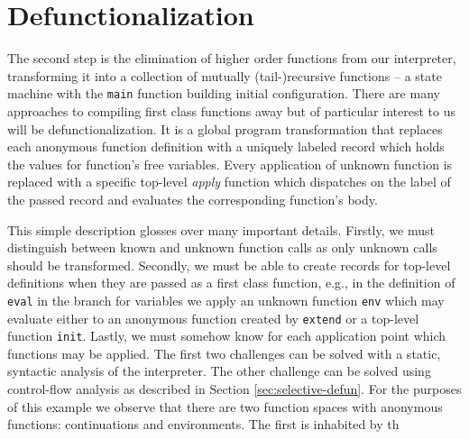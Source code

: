 \section{Defunctionalization}
The second step is the elimination of higher order functions from our interpreter, transforming it into a collection of mutually (tail-)recursive functions -- a state machine with the \texttt{main} function building initial configuration.
There are many approaches to compiling first class functions away but of particular interest to us will be defunctionalization.
It is a global program transformation that replaces each anonymous function definition with a uniquely labeled record which holds the values for function's free variables.
Every application of unknown function is replaced with a specific top-level \textit{apply} function which dispatches on the label of the passed record and evaluates the corresponding function's body.

This simple description glosses over many important details.
Firstly, we must distinguish between known and unknown function calls as only unknown calls should be transformed.
Secondly, we must be able to create records for top-level definitions when they are passed as a first class function, e.g., in the definition of \texttt{eval} in the branch for variables we apply an unknown function \texttt{env} which may evaluate either to an anonymous function created by \texttt{extend} or a top-level function \texttt{init}.
Lastly, we must somehow know for each application point which functions may be applied.
The first two challenges can be solved with a static, syntactic analysis of the interpreter.
The other challenge can be solved using control-flow analysis as described in Section \ref{sec:selective-defun}.
For the purposes of this example we observe that there are two function spaces with anonymous functions: continuations and environments.
The first is inhabited by th

